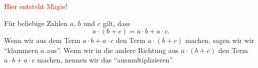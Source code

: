 \documentclass[../../main.tex]{subfiles}
\begin{document}
	\textcolor{red}{Hier entsteht Magie!}

	\begin{theorem}
		Für beliebige Zahlen $a$, $b$ und $c$ gilt, dass
		\[a\cdot (b+c) = a\cdot b + a\cdot c.\]
		Wenn wir aus dem Term $a\cdot b + a\cdot c$ den Term $a \cdot (b+c)$ machen, sagen wir wir \enquote{klammern $a$ aus}.
		Wenn wir in die andere Richtung aus $a \cdot (b+c)$ den Term $a\cdot b + a\cdot c$ machen, nennen wir das \enquote{ausmultiplizieren}.
	\end{theorem}
\end{document}
